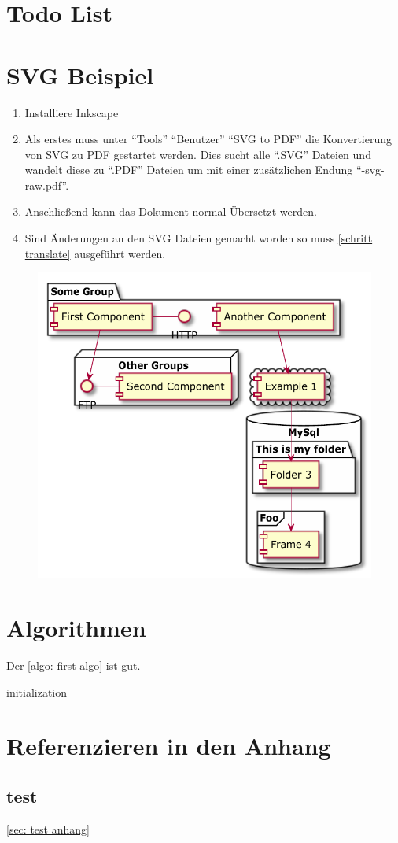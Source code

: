 \documentclass[./\jobname.tex]{subfiles}
\begin{document}
\chapter{Todo List}
%
\lipsum[1] 
\lipsum[2] 
\lipsum[3]
%
\chapter{SVG Beispiel}
%
\begin{enumerate}
	\item Installiere Inkscape
	\item Als erstes muss unter \enquote{Tools} \pfeil \enquote{Benutzer} \pfeil \enquote{SVG to PDF} die Konvertierung von SVG zu PDF gestartet werden. Dies sucht alle \enquote{.SVG} Dateien und wandelt diese zu \enquote{.PDF} Dateien um mit einer zusätzlichen Endung \enquote{-svg-raw.pdf}.\label{schritt translate}
	\item Anschließend kann das Dokument normal Übersetzt werden.
	\item Sind Änderungen an den SVG Dateien gemacht worden so muss \ref{schritt translate} ausgeführt werden.
\end{enumerate}
%
\begin{figure}[H]
	\centering
	\includegraphics[width=0.75\linewidth]{./img/svg/Component_Diagram-test-svg-raw.pdf}
	\label{fig: beispiel svg}
\end{figure}
%
\chapter{Algorithmen}
%
Der \autoref{algo: first algo} ist gut.\par
%
\begin{algorithm}[H]
	\SetAlgoNoLine
	\DontPrintSemicolon
	initialization\;
	\label{algo: first algo}
\end{algorithm}
%
\chapter{Referenzieren in den Anhang}
%
\section{test}
%
\autoref{sec: test anhang}
%
\end{document}
